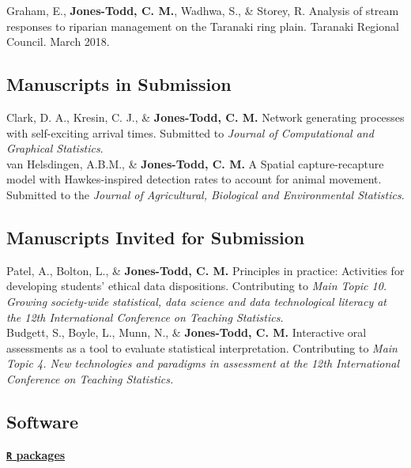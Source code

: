 \documentclass[10pt,a4paper]{moderncv}
\begin{document}
Graham, E., \textbf{Jones-Todd, C. M.}, Wadhwa, S., \& Storey, R. Analysis of stream responses to riparian management on the Taranaki ring plain. Taranaki Regional Council. March 2018.\\

\vspace{2pt}

\subsection{Manuscripts in Submission}

Clark, D. A., Kresin, C. J., \&  \textbf{Jones-Todd, C. M.} Network generating processes with self-exciting arrival times. Submitted to \textit{Journal of Computational and Graphical Statistics}.\\

 van Helsdingen, A.B.M., \& \textbf{Jones-Todd, C. M.} A Spatial capture-recapture model with Hawkes-inspired detection rates to account for animal movement. Submitted to the \textit{Journal of Agricultural, Biological and Environmental Statistics}.\\

\subsection{Manuscripts Invited for Submission}

Patel, A., Bolton, L., \& \textbf{Jones-Todd, C. M.} Principles in practice: Activities for developing students' ethical data dispositions. Contributing to \textit{Main Topic 10. Growing society-wide statistical, data science and data technological literacy at the 12th International Conference on Teaching Statistics.}\\

Budgett, S., Boyle, L., Munn, N.,  \& \textbf{Jones-Todd, C. M.} Interactive oral assessments as a tool to evaluate statistical interpretation. Contributing to \textit{Main Topic 4. New technologies and paradigms in assessment at the 12th International Conference on Teaching Statistics.}\\

\vspace{2pt}

\subsection{Software}


\underline{\textbf{\texttt{R} packages}}\\
\vspace{-3pt}
\end{document}
